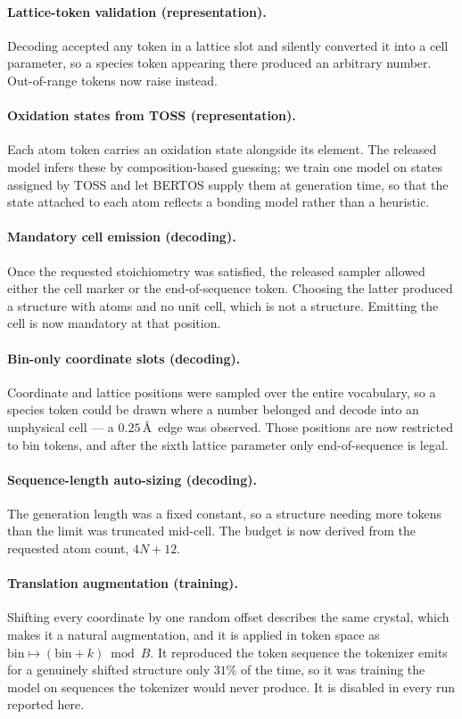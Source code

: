 \documentclass[manuscript,screen,review]{acmart}
\begin{document}
\paragraph{Lattice-token validation (representation).}
Decoding accepted any token in a lattice slot and silently converted it into a
cell parameter, so a species token appearing there produced an arbitrary number.
Out-of-range tokens now raise instead.

\paragraph{Oxidation states from TOSS (representation).}
Each atom token carries an oxidation state alongside its element. The released
model infers these by composition-based guessing; we train one model on states
assigned by TOSS and let BERTOS supply them at generation time, so that the
state attached to each atom reflects a bonding model rather than a heuristic.

\paragraph{Mandatory cell emission (decoding).}
Once the requested stoichiometry was satisfied, the released sampler allowed
either the cell marker or the end-of-sequence token. Choosing the latter
produced a structure with atoms and no unit cell, which is not a structure.
Emitting the cell is now mandatory at that position.

\paragraph{Bin-only coordinate slots (decoding).}
Coordinate and lattice positions were sampled over the entire vocabulary, so a
species token could be drawn where a number belonged and decode into an
unphysical cell --- a $0.25$\,\AA\ edge was observed. Those positions are now
restricted to bin tokens, and after the sixth lattice parameter only
end-of-sequence is legal.

\paragraph{Sequence-length auto-sizing (decoding).}
The generation length was a fixed constant, so a structure needing more tokens
than the limit was truncated mid-cell. The budget is now derived from the
requested atom count, $4N + 12$.

\paragraph{Translation augmentation (training).}
Shifting every coordinate by one random offset describes the same crystal, which
makes it a natural augmentation, and it is applied in token space as
$\mathrm{bin} \mapsto (\mathrm{bin}+k) \bmod B$. It reproduced the token
sequence the tokenizer emits for a genuinely shifted structure only $31\%$ of
the time, so it was training the model on sequences the tokenizer would never
produce. It is disabled in every run reported here.
\end{document}
